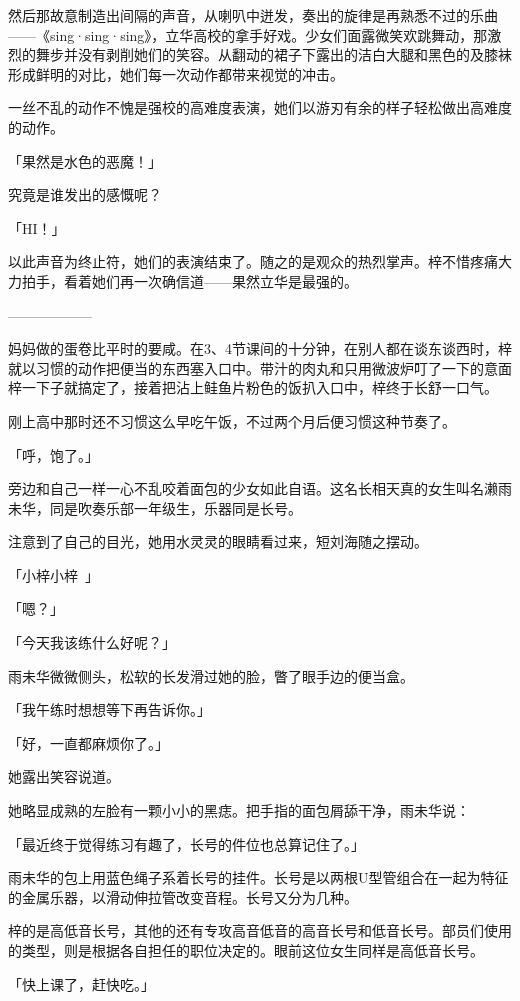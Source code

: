 \documentclass[UTF8]{ctexart}
\begin{document}
    然后那故意制造出间隔的声音，从喇叭中迸发，奏出的旋律是再熟悉不过的乐曲——《sing·sing·sing》，立华高校的拿手好戏。少女们面露微笑欢跳舞动，那激烈的舞步并没有剥削她们的笑容。从翻动的裙子下露出的洁白大腿和黑色的及膝袜形成鲜明的对比，她们每一次动作都带来视觉的冲击。

    一丝不乱的动作不愧是强校的高难度表演，她们以游刃有余的样子轻松做出高难度的动作。

    「果然是水色的恶魔！」

    究竟是谁发出的感慨呢？

    「HI！」

    以此声音为终止符，她们的表演结束了。随之的是观众的热烈掌声。梓不惜疼痛大力拍手，看着她们再一次确信道——果然立华是最强的。

    ——————

    妈妈做的蛋卷比平时的要咸。在3、4节课间的十分钟，在别人都在谈东谈西时，梓就以习惯的动作把便当的东西塞入口中。带汁的肉丸和只用微波炉叮了一下的意面梓一下子就搞定了，接着把沾上鲑鱼片粉色的饭扒入口中，梓终于长舒一口气。

    刚上高中那时还不习惯这么早吃午饭，不过两个月后便习惯这种节奏了。

    「呼，饱了。」

    旁边和自己一样一心不乱咬着面包的少女如此自语。这名长相天真的女生叫名濑雨未华，同是吹奏乐部一年级生，乐器同是长号。

    注意到了自己的目光，她用水灵灵的眼睛看过来，短刘海随之摆动。

    「小梓小梓~」

    「嗯？」

    「今天我该练什么好呢？」

    雨未华微微侧头，松软的长发滑过她的脸，瞥了眼手边的便当盒。

    「我午练时想想等下再告诉你。」

    「好，一直都麻烦你了。」

    她露出笑容说道。

    她略显成熟的左脸有一颗小小的黑痣。把手指的面包屑舔干净，雨未华说：

    「最近终于觉得练习有趣了，长号的件位也总算记住了。」

    雨未华的包上用蓝色绳子系着长号的挂件。长号是以两根U型管组合在一起为特征的金属乐器，以滑动伸拉管改变音程。长号又分为几种。

    梓的是高低音长号，其他的还有专攻高音低音的高音长号和低音长号。部员们使用的类型，则是根据各自担任的职位决定的。眼前这位女生同样是高低音长号。

    「快上课了，赶快吃。」
\end{document}
